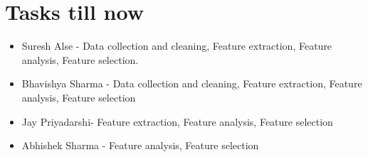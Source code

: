 \documentclass[11pt]{article}
\begin{document}
\section{Tasks till now}
\begin{itemize}
 \item Suresh Alse - Data collection and cleaning, Feature extraction, Feature analysis, Feature selection.
 \item Bhavishya Sharma - Data collection and cleaning, Feature extraction, Feature analysis, Feature selection
 \item Jay Priyadarshi- Feature extraction, Feature analysis, Feature selection
 \item Abhishek Sharma - Feature analysis, Feature selection
\end{itemize}




\end{document}
